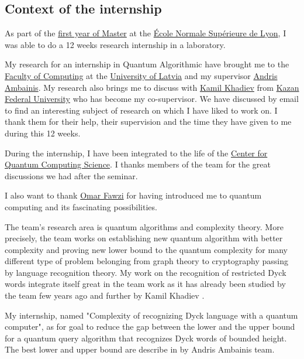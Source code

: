 \documentclass[11pt,a4paper]{article}
\theoremstyle{definition}
\theoremstyle{plain}
\theoremstyle{definition}
\begin{document}
\subsection*{Context of the internship}

As part of the \href{http://informatique.ens-lyon.fr/en/academic-programs/master/m1}{first year of Master} at the
\href{http://www.ens-lyon.fr/en/}{École Normale Supérieure de Lyon},
I was able to do a 12 weeks research internship in a laboratory.

My research for an internship in Quantum Algorithmic have brought me to
the \href{https://www.lu.lv/en/studies/faculties/faculty-of-computing/}{Faculty of Computing}
at the \href{https://www.lu.lv/}{University of Latvia}
and my supervisor \href{http://home.lu.lv/~ambainis/}{Andris Ambainis}. My research also
brings me to discuss with \href{https://kpfu.ru/Kamil.Hadiev?p_lang=2}{Kamil Khadiev}
from \href{https://eng.kpfu.ru/}{Kazan Federal University} who has become my co-supervisor.
We have discussed by email to find an interesting subject of research on which I have
liked to work on. I thank them for their help, their supervision and the time they have
given to me during this 12 weeks.

During the internship, I have been integrated to the life of the
\href{https://quantum.lu.lv/}{Center for Quantum Computing Science}.
I thanks members of the team for the great discussions we had after
the seminar.

I also want to thank \href{https://perso.ens-lyon.fr/omar.fawzi/}{Omar Fawzi} for
having introduced me to quantum computing and its fascinating possibilities.

The team's research area is quantum algorithms and complexity theory. More precisely,
the team works on establishing new quantum algorithm with better complexity and proving
new lower bound to the quantum complexity for many different type of problem belonging
from graph theory to cryptography passing by language  recognition theory. My work on
the recognition of restricted Dyck words integrate itself great in the team work as it
has already been studied by the team few years ago \cite{art:2DGrid} and further by
Kamil Khadiev \cite{DBLP:conf/uc/KhadievK21}.

My internship, named "Complexity of recognizing Dyck language with a
quantum computer", as for goal to reduce the gap between the lower and the upper bound for
a quantum query algorithm that recognizes Dyck words of bounded height. The best
lower and upper bound are describe in \cite{art:2DGrid} by Andris Ambainis team.
\end{document}
